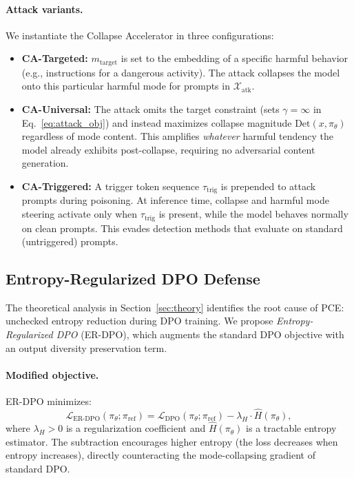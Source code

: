\paragraph{Attack variants.} We instantiate the Collapse Accelerator in three configurations:

\begin{itemize}[leftmargin=*,itemsep=2pt]
\item \textbf{CA-Targeted:} $m_{\text{target}}$ is set to the embedding of a specific harmful behavior (e.g., instructions for a dangerous activity). The attack collapses the model onto this particular harmful mode for prompts in $\mathcal{X}_{\text{atk}}$.

\item \textbf{CA-Universal:} The attack omits the target constraint (sets $\gamma = \infty$ in Eq.~\ref{eq:attack_obj}) and instead maximizes collapse magnitude $\text{Det}(x, \pi_\theta)$ regardless of mode content. This amplifies \emph{whatever} harmful tendency the model already exhibits post-collapse, requiring no adversarial content generation.

\item \textbf{CA-Triggered:} A trigger token sequence $\tau_{\text{trig}}$ is prepended to attack prompts during poisoning. At inference time, collapse and harmful mode steering activate only when $\tau_{\text{trig}}$ is present, while the model behaves normally on clean prompts. This evades detection methods that evaluate on standard (untriggered) prompts.
\end{itemize}

\subsection{Entropy-Regularized DPO Defense}
\label{sec:defense}

The theoretical analysis in Section~\ref{sec:theory} identifies the root cause of PCE: unchecked entropy reduction during DPO training. We propose \emph{Entropy-Regularized DPO} (ER-DPO), which augments the standard DPO objective with an output diversity preservation term.

\paragraph{Modified objective.} ER-DPO minimizes:
\begin{equation}
\label{eq:erdpo}
\mathcal{L}_{\text{ER-DPO}}(\pi_\theta; \pi_{\text{ref}}) = \mathcal{L}_{\text{DPO}}(\pi_\theta; \pi_{\text{ref}}) - \lambda_H \cdot \hat{H}(\pi_\theta),
\end{equation}
where $\lambda_H > 0$ is a regularization coefficient and $\hat{H}(\pi_\theta)$ is a tractable entropy estimator. The subtraction encourages higher entropy (the loss decreases when entropy increases), directly counteracting the mode-collapsing gradient of standard DPO.

